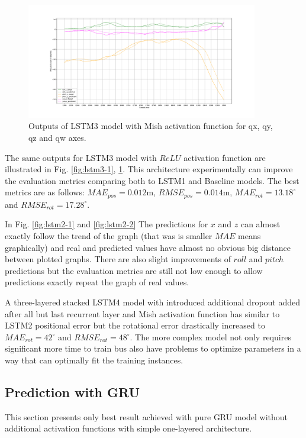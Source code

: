 \begin{figure}[b!]
	\begin{center}
		\includegraphics[width=0.9\textwidth, keepaspectratio]{gfx/lstm3_mish-roll_pitch_yaw.pdf}
		\caption{\label{fig:lstm3-2} Outputs of LSTM3 model with Mish activation function for qx, qy, qz and qw axes.}
	\end{center}
\end{figure}

The same outputs for LSTM3 model with $ReLU$ activation function are illustrated in Fig. \ref{fig:lstm3-1}, \ref{fig:lstm3-2}. This architecture experimentally can improve the evaluation metrics comparing both to LSTM1 and Baseline models. The best metrics are as follows:  $MAE_{pos} = 0.012$m, $RMSE_{pos} = 0.014$m, $MAE_{rot} = 13.18^{\circ}$ and $RMSE_{rot}  =17.28^{\circ}$.

In Fig. \ref{fig:lstm2-1} and \ref{fig:lstm2-2}  The predictions for $x$ and $z$ can almost exactly follow the trend of the graph (that was is smaller $MAE$ means graphically) and real and predicted values have almost no obvious big distance between plotted graphs. There are also slight improvements of $roll$ and $pitch$ predictions but the evaluation metrics are still not low enough to allow predictions exactly repeat the graph of real values. 

A three-layered stacked LSTM4 model with introduced additional dropout added after all but last recurrent layer and Mish activation function has similar to LSTM2 positional error but the rotational error drastically increased to $MAE_{rot} = 42^{\circ}$ and $RMSE_{rot}  =48^{\circ}$. The more complex model not only requires significant more time to train bus also have problems to optimize parameters in a way that can optimally fit the training instances. 

\subsection{Prediction with GRU}
\label{sec:eval:experiments:gru}
This section presents only best result achieved with pure GRU model without additional activation functions with simple one-layered architecture. 

